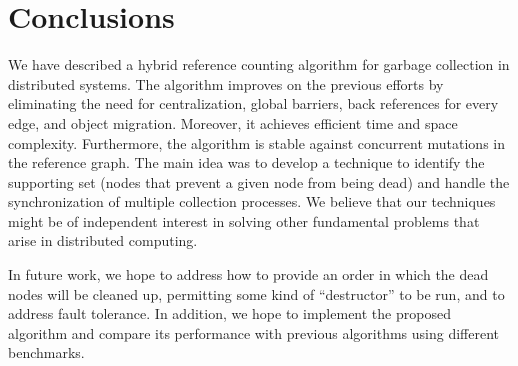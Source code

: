\section{Conclusions}
\label{section:conclusions}

We have described a hybrid reference counting algorithm for garbage collection
in distributed systems. The algorithm improves on the previous
efforts by eliminating the need for centralization, 
global barriers, back references for every edge, and object migration. Moreover, it achieves efficient time and
space complexity. %
Furthermore, the algorithm is stable against
concurrent mutations in the reference graph. %
The main idea was to develop a technique
to identify the supporting set (nodes that prevent a given node from being
dead) and handle the synchronization of multiple collection processes.
We believe that our techniques
might be of independent interest in solving other fundamental problems that
arise in distributed computing. 

In future work, we hope to address how to provide an order in which the dead
nodes will be cleaned up, permitting some kind of ``destructor'' to be run, and
to address fault tolerance. In addition, we hope to implement the proposed
algorithm and compare its performance with previous algorithms using different
benchmarks.
